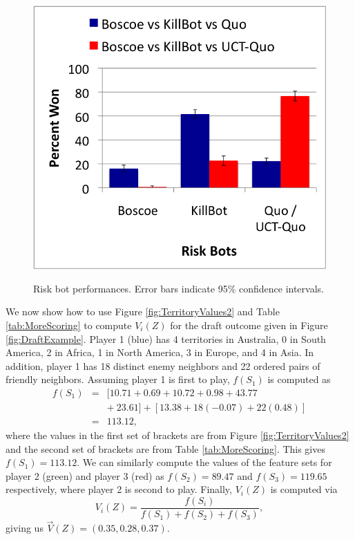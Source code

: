 \documentclass[letterpaper]{article}
\numberwithin{equation}{section}
\numberwithin{theorem}{section}
\numberwithin{lemma}{section}
\numberwithin{df}{section}
\begin{document}
\begin{figure}[t]
{		\includegraphics[scale=.45]{BoscoeKillQuo.png}
		\label{fig:BoscoeKillBotQuo}
	}
	\caption[]{Risk bot performances.  Error bars indicate 95\% confidence intervals.}
	\label{fig:RiskResults}
\end{figure}

We now show how to use Figure \ref{fig:TerritoryValues2} and Table \ref{tab:MoreScoring} to compute $V_i(Z)$ for the draft outcome given in Figure \ref{fig:DraftExample}.  Player 1 (blue) has 4 territories in Australia, 0 in South America, 2 in Africa, 1 in North America, 3 in Europe, and 4 in Asia.  In addition, player 1 has 18 distinct enemy neighbors and 22 ordered pairs of friendly neighbors.  Assuming player 1 is first to play, $f(S_1)$ is computed as
\begin{eqnarray*}
 	f(S_1) &=& [10.71 + 0.69 + 10.72 + 0.98 + 43.77 \\ &&+\ 23.61] + [13.38 + 18(-0.07) + 22(0.48)] \\
 				 &=& 113.12,
\end{eqnarray*}
where the values in the first set of brackets are from Figure \ref{fig:TerritoryValues2} and the second set of brackets are from Table \ref{tab:MoreScoring}.  This gives $f(S_1) = 113.12$.  We can similarly compute the values of the feature sets for player 2 (green) and player 3 (red) as %
$f(S_2) = 89.47$ and $f(S_3) = 119.65$ respectively, where player 2 is second to play.  Finally, $V_i(Z)$ is computed via %
\[ V_i(Z) = \frac{f(S_i)}{f(S_1) + f(S_2) + f(S_3)}, \]
giving us %
$\vec{V}(Z) = (0.35, 0.28, 0.37)$.
\end{document}
